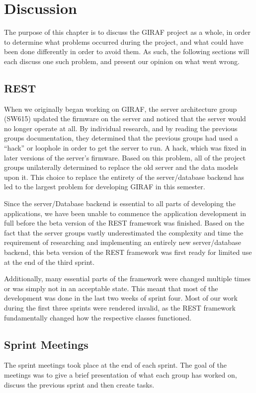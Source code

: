 \chapter{Discussion}
The purpose of this chapter is to discuss the GIRAF project as a whole, in order
to determine what problems occurred during the project, and what could have been
done differently in order to avoid them. As such, the following sections will
each discuss one such problem, and present our opinion on what went wrong.

\section{REST}
When we originally began working on GIRAF, the server
architecture group (SW615) updated the firmware on the server and noticed that
the server would no longer operate at all. By individual research, and by
reading the previous groups documentation, they determined that the previous
groups had used a ``hack'' or loophole in order to get the server to run. A
hack, which was fixed in later versions of the server's firmware. Based on this
problem, all of the project groups unilaterally determined to replace the old
server and the data models upon it. This choice to replace the entirety of
the server/database backend has led to the largest problem for developing GIRAF
in this semester.\nl

Since the server/Database backend is essential to all parts of developing the
applications, we have been unable to commence the application development in
full before the beta version of the REST framework was finished. Based on the
fact that the server groups vastly underestimated the complexity and time
the requirement of researching and implementing an entirely new server/database
backend, this beta version of the REST framework was first ready for limited use
at the end of the third sprint.\nl

Additionally, many essential parts of the
framework were changed multiple times or was simply not in an acceptable state. This meant that
most of the development was done in the last two weeks of sprint four. Most of
our work during the first three sprints were rendered invalid, as the REST
framework fundamentally changed how the respective classes functioned.

\section{Sprint Meetings}
The sprint meetings took place at the end of each sprint. The goal of the
meetings was to give a brief presentation of what each group has worked on,
discuss the previous sprint and then create tasks.\nl

